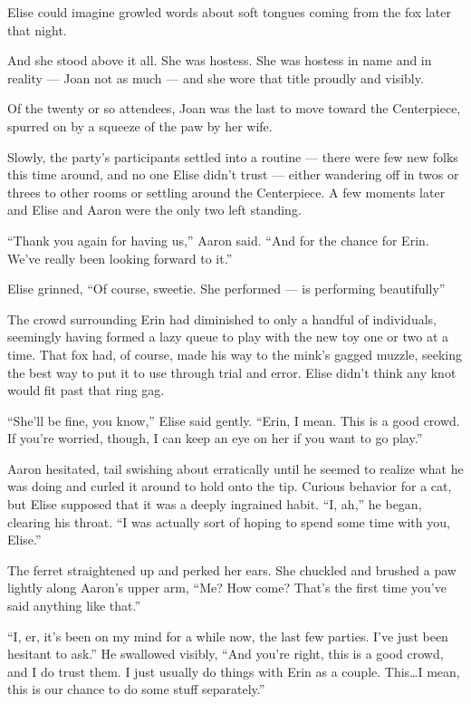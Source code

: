 Elise could imagine growled words about soft tongues coming from the fox
later that night.

And she stood above it all. She was hostess. She was hostess in name and
in reality --- Joan not as much --- and she wore that title proudly and
visibly.

Of the twenty or so attendees, Joan was the last to move toward the
Centerpiece, spurred on by a squeeze of the paw by her wife.

Slowly, the party's participants settled into a routine --- there were
few new folks this time around, and no one Elise didn't trust --- either
wandering off in twos or threes to other rooms or settling around the
Centerpiece. A few moments later and Elise and Aaron were the only two
left standing.

``Thank you again for having us,'' Aaron said. ``And for the chance for
Erin. We've really been looking forward to it.''

Elise grinned, ``Of course, sweetie. She performed --- is performing
beautifully''

The crowd surrounding Erin had diminished to only a handful of
individuals, seemingly having formed a lazy queue to play with the new
toy one or two at a time. That fox had, of course, made his way to the
mink's gagged muzzle, seeking the best way to put it to use through
trial and error. Elise didn't think any knot would fit past that ring
gag.

``She'll be fine, you know,'' Elise said gently. ``Erin, I mean. This is
a good crowd. If you're worried, though, I can keep an eye on her if you
want to go play.''

Aaron hesitated, tail swishing about erratically until he seemed to
realize what he was doing and curled it around to hold onto the tip.
Curious behavior for a cat, but Elise supposed that it was a deeply
ingrained habit. ``I, ah,'' he began, clearing his throat. ``I was
actually sort of hoping to spend some time with you, Elise.''

The ferret straightened up and perked her ears. She chuckled and brushed
a paw lightly along Aaron's upper arm, ``Me? How come? That's the first
time you've said anything like that.''

``I, er, it's been on my mind for a while now, the last few parties.
I've just been hesitant to ask.'' He swallowed visibly, ``And you're
right, this is a good crowd, and I do trust them. I just usually do
things with Erin as a couple. This\ldots{}I mean, this is our chance to
do some stuff separately.''

